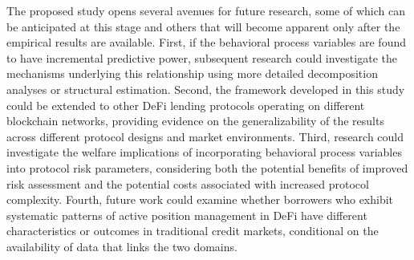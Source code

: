 The proposed study opens several avenues for future research, some of which can be anticipated at this stage and others that will become apparent only after the empirical results are available. First, if the behavioral process variables are found to have incremental predictive power, subsequent research could investigate the mechanisms underlying this relationship using more detailed decomposition analyses or structural estimation. Second, the framework developed in this study could be extended to other DeFi lending protocols operating on different blockchain networks, providing evidence on the generalizability of the results across different protocol designs and market environments. Third, research could investigate the welfare implications of incorporating behavioral process variables into protocol risk parameters, considering both the potential benefits of improved risk assessment and the potential costs associated with increased protocol complexity. Fourth, future work could examine whether borrowers who exhibit systematic patterns of active position management in DeFi have different characteristics or outcomes in traditional credit markets, conditional on the availability of data that links the two domains.
